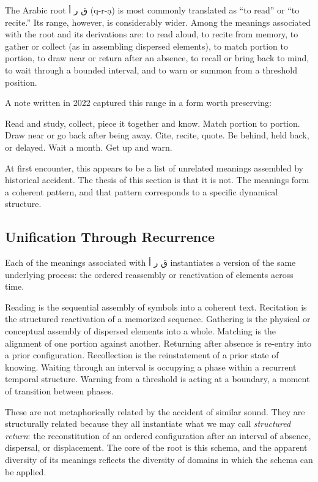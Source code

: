 \documentclass[12pt, oneside]{article}
\newcommand{\AR}[1]{\textarabic{#1}}
\theoremstyle{definition}
\theoremstyle{remark}
\begin{document}
The Arabic root \AR{ق ر أ} (q-r-\d{a}) is most commonly translated as ``to read'' or ``to recite.''
Its range, however, is considerably wider.
Among the meanings associated with the root and its derivations are: to read aloud, to recite from memory, to gather or collect (as in assembling dispersed elements), to match portion to portion, to draw near or return after an absence, to recall or bring back to mind, to wait through a bounded interval, and to warn or summon from a threshold position.

A note written in 2022 captured this range in a form worth preserving:

\begin{quoting}
Read and study, collect, piece it together and know.
Match portion to portion.
Draw near or go back after being away.
Cite, recite, quote.
Be behind, held back, or delayed.
Wait a month.
Get up and warn.
\end{quoting}

At first encounter, this appears to be a list of unrelated meanings assembled by historical accident.
The thesis of this section is that it is not.
The meanings form a coherent pattern, and that pattern corresponds to a specific dynamical structure.

\subsection{Unification Through Recurrence}

Each of the meanings associated with \AR{ق ر أ} instantiates a version of the same underlying process: the ordered reassembly or reactivation of elements across time.

Reading is the sequential assembly of symbols into a coherent text.
Recitation is the structured reactivation of a memorized sequence.
Gathering is the physical or conceptual assembly of dispersed elements into a whole.
Matching is the alignment of one portion against another.
Returning after absence is re-entry into a prior configuration.
Recollection is the reinstatement of a prior state of knowing.
Waiting through an interval is occupying a phase within a recurrent temporal structure.
Warning from a threshold is acting at a boundary, a moment of transition between phases.

These are not metaphorically related by the accident of similar sound.
They are structurally related because they all instantiate what we may call \emph{structured return}: the reconstitution of an ordered configuration after an interval of absence, dispersal, or displacement.
The core of the root is this schema, and the apparent diversity of its meanings reflects the diversity of domains in which the schema can be applied.
\end{document}
